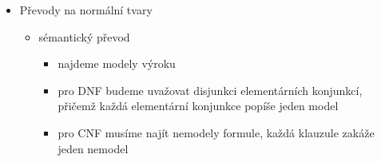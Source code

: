 \begin{itemize}
\begin{itemize}
\begin{itemize}
\begin{itemize}
\item prázdný výrok v CNF je $\top$
\end{itemize}
\item elementární konjunkce je konjunkce literálů
\begin{itemize}
\item jednotková elementární konjunkce je samotný literál
\item prázdná elementární konjunkce je $\top$
\end{itemize}
\item výrok je v disjunktivní normální formě (DNF), pokud je disjunkcí elementárních konjunkcí
\begin{itemize}
\item prázdný výrok v DNF je $\bot$
\end{itemize}
\item výrok je hornovský (v Hornově tvaru), pokud je konjunkcí hornovských klauzulí, tj. klauzulí obsahujících nejvýše jeden pozitivní literál
\end{itemize}
\item množinová reprezentace
\begin{itemize}
\item klauzule je konečná množina literálů
\begin{itemize}
\item prázdnou klauzuli označíme $\square$, není nikdy splněna
\end{itemize}
\item CNF formule je (konečná nebo nekonečná) množina klauzulí
\begin{itemize}
\item prázdná formule $\emptyset$ je vždy splněna
\end{itemize}
\end{itemize}
\end{itemize}
\item Převody na normální tvary
\begin{itemize}
\item sémantický převod
\begin{itemize}
\item najdeme modely výroku
\item pro DNF budeme uvažovat disjunkci elementárních konjunkcí, přičemž každá elementární konjunkce popíše jeden model
\item pro CNF musíme najít nemodely formule, každá klauzule zakáže jeden nemodel
\begin{itemize}

\end{itemize}
\end{itemize}
\end{itemize}
\end{itemize}
